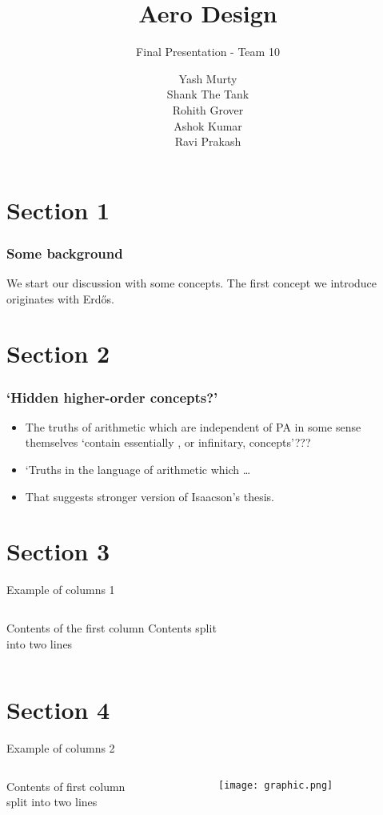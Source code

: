 \documentclass{beamer}
\title[] %
{Aero Design}
\subtitle{Final Presentation - Team 10}
\author[] %
{Yash Murty \\ Shank The Tank \\ Rohith Grover \\ Ashok Kumar \\ Ravi Prakash}
\institute[IIT Madras] %
{
  Department of Aerospace Engineering\\
  Indian Institute of Technology\\
  Madras
}
\date[] %
{}
\begin{document}
	\frame{\titlepage}
	
	\section{Section 1}	
	\begin{frame}
	\frametitle{Some background}
		We start our discussion with some concepts.
	\pause
		The first concept we introduce originates with Erd\H os.
	\end{frame}	
	
	\section{Section 2}
	\begin{frame}
	\frametitle{`Hidden higher-order concepts?'}
	\begin{itemize}[<+->]
	\item The truths of arithmetic which are independent of PA in some 
	sense themselves `{contain} essentially {\color{blue}{hidden higher-order}},
	 or infinitary, concepts'???
	\item `Truths in the language of arithmetic which \ldots
	\item	That suggests stronger version of Isaacson's thesis. 
	\end{itemize}
	\end{frame}
	
	\section{Section 3}
	\begin{frame}{Example of columns 1}
    \begin{columns}[c] %
     Contents of the first column
     Contents split \\ into two lines
    \end{columns}
	\end{frame}
 
	\section{Section 4}
	\begin{frame}{Example of columns 2}
     \begin{columns}[t] %
     \begin{column}[T]{5cm} %
     Contents of first column \\ split into two lines
     \end{column}
     \begin{column}[T]{5cm} %
          \texttt{[image: graphic.png]}
     \end{column}
     \end{columns}
	\end{frame}
	
\end{document}
